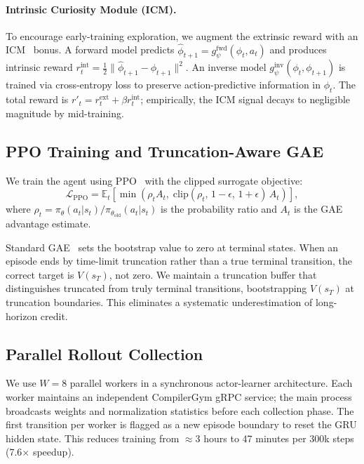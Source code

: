 \documentclass{article}
\begin{document}
\paragraph{Intrinsic Curiosity Module (ICM).}
To encourage early-training exploration, we augment the extrinsic reward with
an ICM~\cite{pathak2017curiosity} bonus.  A forward model predicts
$\hat{\phi}_{t+1} = g^{\mathrm{fwd}}_\psi(\phi_t, a_t)$ and produces
intrinsic reward $r_t^{\mathrm{int}} = \tfrac{1}{2}\|\hat{\phi}_{t+1} - \phi_{t+1}\|^2$.
An inverse model $g^{\mathrm{inv}}_\psi(\phi_t, \phi_{t+1})$ is trained via
cross-entropy loss to preserve action-predictive information in $\phi_t$.
The total reward is $r'_t = r_t^{\mathrm{ext}} + \beta r_t^{\mathrm{int}}$;
empirically, the ICM signal decays to negligible magnitude by mid-training.

\subsection{PPO Training and Truncation-Aware GAE}

We train the agent using PPO~\cite{schulman2017proximal} with the clipped
surrogate objective:
\begin{equation}
  \mathcal{L}_{\mathrm{PPO}}
  = \mathbb{E}_t\!\left[
    \min\!\left(
      \rho_t A_t,\;
      \mathrm{clip}(\rho_t,\, 1{-}\epsilon,\, 1{+}\epsilon)\, A_t
    \right)
  \right],
\end{equation}
where $\rho_t = \pi_\theta(a_t|s_t)/\pi_{\theta_{\mathrm{old}}}(a_t|s_t)$
is the probability ratio and $A_t$ is the GAE advantage estimate.

Standard GAE~\cite{schulman2015high} sets the bootstrap value to zero at
terminal states.  When an episode ends by time-limit truncation rather than
a true terminal transition, the correct target is $V(s_T)$, not zero.  We
maintain a truncation buffer that distinguishes truncated from truly terminal
transitions, bootstrapping $V(s_T)$ at truncation boundaries.  This
eliminates a systematic underestimation of long-horizon credit.

\subsection{Parallel Rollout Collection}

We use $W{=}8$ parallel workers in a synchronous actor-learner
architecture.  Each worker maintains an independent CompilerGym gRPC service;
the main process broadcasts weights and normalization statistics before each
collection phase.  The first transition per worker is flagged as a new episode
boundary to reset the GRU hidden state.  This reduces training from
$\approx$3 hours to 47 minutes per 300k steps (7.6$\times$ speedup).
\end{document}
